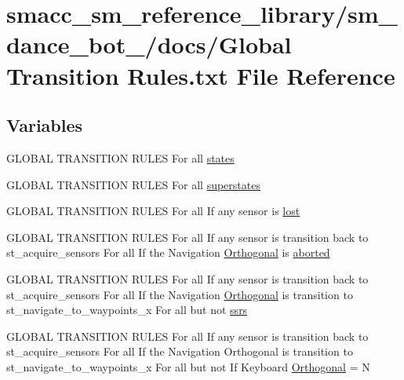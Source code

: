 \hypertarget{3_2docs_2Global_01Transition_01Rules_8txt}{}\section{smacc\+\_\+sm\+\_\+reference\+\_\+library/sm\+\_\+dance\+\_\+bot\+\_/docs/\+Global Transition Rules.\+txt File Reference}
\label{3_2docs_2Global_01Transition_01Rules_8txt}
\subsection*{Variables}
\begin{DoxyCompactItemize}
\item 
G\+L\+O\+B\+AL T\+R\+A\+N\+S\+I\+T\+I\+ON R\+U\+L\+ES For all \hyperlink{3_2docs_2Global_01Transition_01Rules_8txt_a54d1602740c77675ed14ebfe688f4374}{states}
\item 
G\+L\+O\+B\+AL T\+R\+A\+N\+S\+I\+T\+I\+ON R\+U\+L\+ES For all \hyperlink{3_2docs_2Global_01Transition_01Rules_8txt_af31ae27f561335eed0d5161d8ee256f8}{superstates}
\item 
G\+L\+O\+B\+AL T\+R\+A\+N\+S\+I\+T\+I\+ON R\+U\+L\+ES For all If any sensor is \hyperlink{3_2docs_2Global_01Transition_01Rules_8txt_a21166d43cc40d1ae31189d3fe91d8346}{lost}
\item 
G\+L\+O\+B\+AL T\+R\+A\+N\+S\+I\+T\+I\+ON R\+U\+L\+ES For all If any sensor is transition back to st\+\_\+acquire\+\_\+sensors For all If the Navigation \hyperlink{3_2docs_2Global_01Transition_01Rules_8txt_a2e1cdec29dad5013e514270d0a78fe22}{Orthogonal} is \hyperlink{3_2docs_2Global_01Transition_01Rules_8txt_a682ac6cc3cf2eeec69ad3f310ae363ea}{aborted}
\item 
G\+L\+O\+B\+AL T\+R\+A\+N\+S\+I\+T\+I\+ON R\+U\+L\+ES For all If any sensor is transition back to st\+\_\+acquire\+\_\+sensors For all If the Navigation \hyperlink{3_2docs_2Global_01Transition_01Rules_8txt_a2e1cdec29dad5013e514270d0a78fe22}{Orthogonal} is transition to st\+\_\+navigate\+\_\+to\+\_\+waypoints\+\_\+x For all but not \hyperlink{3_2docs_2Global_01Transition_01Rules_8txt_aa881c6a22397113c3342bf4c44212934}{ssrs}
\item 
G\+L\+O\+B\+AL T\+R\+A\+N\+S\+I\+T\+I\+ON R\+U\+L\+ES For all If any sensor is transition back to st\+\_\+acquire\+\_\+sensors For all If the Navigation Orthogonal is transition to st\+\_\+navigate\+\_\+to\+\_\+waypoints\+\_\+x For all but not If Keyboard \hyperlink{3_2docs_2Global_01Transition_01Rules_8txt_a2e1cdec29dad5013e514270d0a78fe22}{Orthogonal} = N

\end{DoxyCompactItemize}
